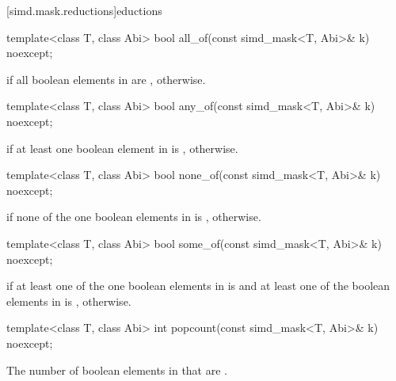 [simd.mask.reductions]{\texorpdfstring{eductions}{simd_mask reductions}}

\begin{itemdecl}
template<class T, class Abi> bool all_of(const simd_mask<T, Abi>& k) noexcept;
\end{itemdecl}

\begin{itemdescr}
  \pnum\returns
   if all boolean elements in  are ,  otherwise.
\end{itemdescr}

\begin{itemdecl}
template<class T, class Abi> bool any_of(const simd_mask<T, Abi>& k) noexcept;
\end{itemdecl}

\begin{itemdescr}
  \pnum\returns
   if at least one boolean element in  is ,  otherwise.
\end{itemdescr}

\begin{itemdecl}
template<class T, class Abi> bool none_of(const simd_mask<T, Abi>& k) noexcept;
\end{itemdecl}

\begin{itemdescr}
  \pnum\returns
   if none of the one boolean elements in  is ,  otherwise.
\end{itemdescr}

\begin{itemdecl}
template<class T, class Abi> bool some_of(const simd_mask<T, Abi>& k) noexcept;
\end{itemdecl}

\begin{itemdescr}
  \pnum\returns
   if at least one of the one boolean elements in  is  and at least one of the boolean elements in  is ,  otherwise.
\end{itemdescr}

\begin{itemdecl}
template<class T, class Abi> int popcount(const simd_mask<T, Abi>& k) noexcept;
\end{itemdecl}

\begin{itemdescr}
  \pnum\returns
  The number of boolean elements in  that are .
\end{itemdescr}

